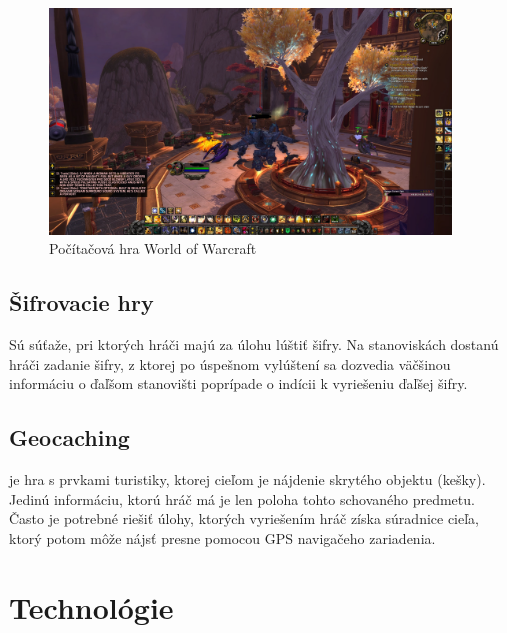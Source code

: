 \begin{figure}[h]
  \centering
  \includegraphics[height=6cm]{mainmatter/imgs/wow.jpg}
  \caption{Počítačová hra World of Warcraft}
  \label{fig:comenius}
\end{figure}


\subsection{Šifrovacie hry}
Sú súťaže, pri ktorých hráči majú za úlohu lúštiť šifry. Na stanoviskách dostanú hráči zadanie šifry, z ktorej po úspešnom vylúštení sa dozvedia väčšinou informáciu o ďaľšom stanovišti poprípade o indícii k vyriešeniu ďaľšej šifry. 

\subsection{Geocaching}\cite{geocaching} je hra s prvkami turistiky, ktorej cieľom je nájdenie skrytého objektu (kešky). Jedinú informáciu, ktorú hráč má je len poloha tohto schovaného predmetu. Často je potrebné riešiť úlohy, ktorých vyriešením hráč získa súradnice cieľa, ktorý potom môže nájsť presne pomocou GPS navigačeho zariadenia.

\section{Technológie}


